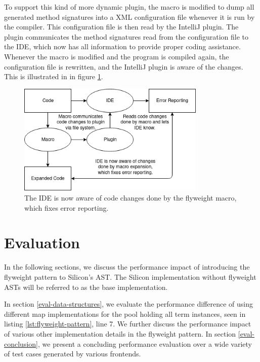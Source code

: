 \documentclass[11pt]{article}
\begin{document}
    To support this kind of more dynamic plugin, the macro is modified to
    dump all generated method signatures into a XML configuration file whenever
    it is run by the compiler.
    This configuration file is then read by the IntelliJ plugin. The plugin
    communicates the method signatures read from the configuration file
    to the IDE, which now has all information to provide proper
    coding assistance.
    Whenever the macro is modified and the program is compiled again,
    the configuration file is rewritten, and the IntelliJ plugin is
    aware of the changes. This is illustrated in in figure \ref{fig:ide-fixed-generic}.

    \begin{figure}[H]
        \begin{center}
            \includegraphics[width=0.8\textwidth]{ide-fixed-generic.png}
            \caption{The IDE is now aware of code changes done by the flyweight macro, which fixes error reporting.}
            \label{fig:ide-fixed-generic}
        \end{center}   
    \end{figure}

    \newpage
    \section{Evaluation}

    In the following sections, we discuss the performance
    impact of introducing the flyweight pattern to Silicon's AST.
    The Silicon implementation without flyweight
    ASTs will be referred to as the base implementation.

    In section \ref{eval-data-structures}, we evaluate the performance difference of using
    different map implementations for the pool holding all
    term instances, seen in listing \ref{lst:flyweight-pattern}, line 7.
    We further discuss the performance impact
    of various other implementation details in the flyweight pattern.
    In section \ref{eval-conclusion}, we present a concluding performance
    evaluation over a wide variety of test cases generated by various frontends.
\end{document}
